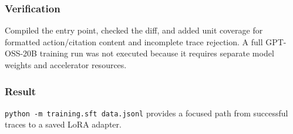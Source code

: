 \subsubsection{Verification}

Compiled the entry point, checked the diff, and added unit coverage for formatted action/citation content and incomplete trace rejection. A full GPT-OSS-20B training run was not executed because it requires separate model weights and accelerator resources.

\subsubsection{Result}

\texttt{python\ -m\ training.sft\ data.jsonl} provides a focused path from successful traces to a saved LoRA adapter.

